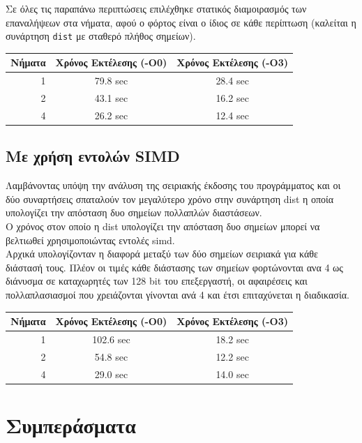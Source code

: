 \documentclass{article}
\begin{document}
Σε όλες τις παραπάνω περιπτώσεις επιλέχθηκε στατικός διαμοιρασμός των επαναλήψεων στα νήματα, αφού ο φόρτος είναι ο ίδιος σε κάθε περίπτωση (καλείται η συνάρτηση \texttt{dist} με σταθερό πλήθος σημείων).

\begin{center}
\begin{tabular}{|r|c|c|}
    \hline
    Νήματα & Χρόνος Εκτέλεσης (-Ο0) & Χρόνος Εκτέλεσης (-Ο3) \\ \hline
    1 & 79.8 sec & 28.4 sec \\
    2 & 43.1 sec & 16.2 sec \\
    4 & 26.2 sec & 12.4 sec \\ \hline
\end{tabular}
\end{center}

\subsection{Με χρήση εντολών SIMD}
Λαμβάνοντας υπόψη την ανάλυση της σειριακής έκδοσης του προγράμματος και οι δύο συναρτήσεις σπαταλούν τον μεγαλύτερο χρόνο στην συνάρτηση dist η οποία υπολογίζει την απόσταση δυο σημείων πολλαπλών διαστάσεων.\\
Ο χρόνος στον οποίο η dist υπολογίζει την απόσταση δυο σημείων μπορεί να βελτιωθεί χρησιμοποιώντας εντολές simd.\\
Αρχικά υπολογίζονταν η διαφορά μεταξύ των δύο σημείων σειριακά για κάθε διάστασή τους. Πλέον οι τιμές κάθε διάστασης των σημείων φορτώνονται ανα 4 ως διάνυσμα σε καταχωρητές των 128 bit του επεξεργαστή, οι αφαιρέσεις και πολλαπλασιασμοί που χρειάζονται γίνονται ανά 4 και έτσι επιταχύνεται η διαδικασία.

\begin{center}
\begin{tabular}{|r|c|c|}
    \hline
    Νήματα & Χρόνος Εκτέλεσης (-O0) & Χρόνος Εκτέλεσης (-Ο3) \\ \hline
    1 & 102.6 sec & 18.2 sec \\
    2 & 54.8 sec & 12.2 sec \\
    4 & 29.0 sec & 14.0 sec \\ \hline
\end{tabular}
\end{center}

\section{Συμπεράσματα}
\end{document}
